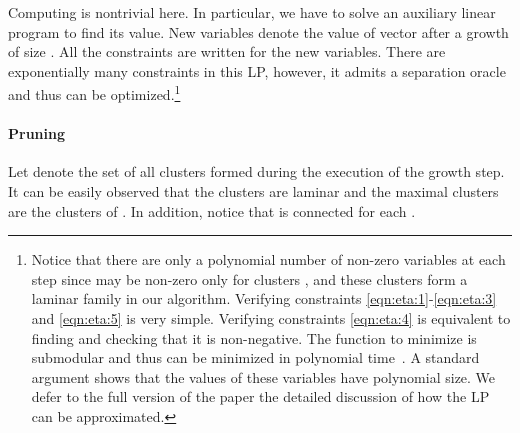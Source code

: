 Computing  is nontrivial here.
In particular, we have to solve an auxiliary linear program to find its value.
New variables  denote the value of vector  after a growth of
size .  All the constraints are written for the new variables.
There are exponentially many constraints in this LP, however,
it admits a separation oracle and thus can be optimized.\footnote{
Notice that there are only a polynomial number of non-zero variables at each step
since  may be non-zero only for clusters , and these clusters form a
laminar family in our algorithm.
Verifying constraints \eqref{eqn:eta:1}-\eqref{eqn:eta:3} and \eqref{eqn:eta:5} is very simple.
Verifying constraints \eqref{eqn:eta:4} is equivalent to finding 
 and checking that it is non-negative.
The function to minimize is submodular and thus can be minimized in polynomial time~\cite{IFF00}.
A standard argument shows that the values of these variables have polynomial size.
We defer to the full version of the paper the detailed discussion of
how the LP can be approximated. 
} 











\paragraph{Pruning}
Let  denote the set of all clusters formed during the execution
of the growth step.  It can be easily observed that the clusters 
are laminar and the maximal clusters are the clusters of . 
In addition, notice that  is connected for each .
 
